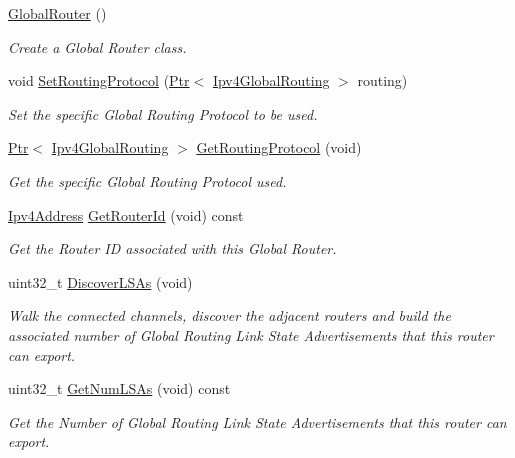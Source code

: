 \begin{DoxyCompactItemize}
\item 
\hyperlink{classns3_1_1GlobalRouter_a778050c70fe491c0fe62b7cf6b10aaf6}{Global\+Router} ()
\begin{DoxyCompactList}\small\item\em Create a Global Router class. \end{DoxyCompactList}\item 
void \hyperlink{classns3_1_1GlobalRouter_abaae22deb0f40803687805e2380f4684}{Set\+Routing\+Protocol} (\hyperlink{classns3_1_1Ptr}{Ptr}$<$ \hyperlink{classns3_1_1Ipv4GlobalRouting}{Ipv4\+Global\+Routing} $>$ routing)
\begin{DoxyCompactList}\small\item\em Set the specific Global Routing Protocol to be used. \end{DoxyCompactList}\item 
\hyperlink{classns3_1_1Ptr}{Ptr}$<$ \hyperlink{classns3_1_1Ipv4GlobalRouting}{Ipv4\+Global\+Routing} $>$ \hyperlink{classns3_1_1GlobalRouter_a720ae2fce6e8a8a6ac4ae8c69b2a6715}{Get\+Routing\+Protocol} (void)
\begin{DoxyCompactList}\small\item\em Get the specific Global Routing Protocol used. \end{DoxyCompactList}\item 
\hyperlink{classns3_1_1Ipv4Address}{Ipv4\+Address} \hyperlink{classns3_1_1GlobalRouter_a746a83343a6868e415f29ceed9dc0cd0}{Get\+Router\+Id} (void) const 
\begin{DoxyCompactList}\small\item\em Get the Router ID associated with this Global Router. \end{DoxyCompactList}\item 
uint32\+\_\+t \hyperlink{classns3_1_1GlobalRouter_a44e135879879a27cd8d2566b5e9761cf}{Discover\+L\+S\+As} (void)
\begin{DoxyCompactList}\small\item\em Walk the connected channels, discover the adjacent routers and build the associated number of Global Routing Link State Advertisements that this router can export. \end{DoxyCompactList}\item 
uint32\+\_\+t \hyperlink{classns3_1_1GlobalRouter_addd8a89e462a36660a3f68dec959bb19}{Get\+Num\+L\+S\+As} (void) const 
\begin{DoxyCompactList}\small\item\em Get the Number of Global Routing Link State Advertisements that this router can export. \end{DoxyCompactList}\item 

\end{DoxyCompactItemize}
